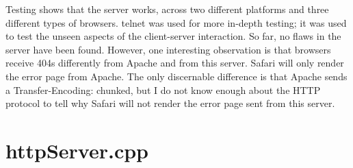\documentclass[11pt]{report}
\begin{document}
Testing shows that the server works, across two different platforms and three different types of browsers. telnet was used for more in-depth testing; it was used to test the unseen aspects of the client-server interaction. So far, no flaws in the server have been found. However, one interesting observation is that browsers receive 404s differently from Apache and from this server. Safari will only render the error page from Apache. The only discernable difference is that Apache sends a Transfer-Encoding: chunked, but I do not know enough about the HTTP protocol to tell why Safari will not render the error page sent from this server.

\appendix

\chapter{httpServer.cpp}

\end{document}
